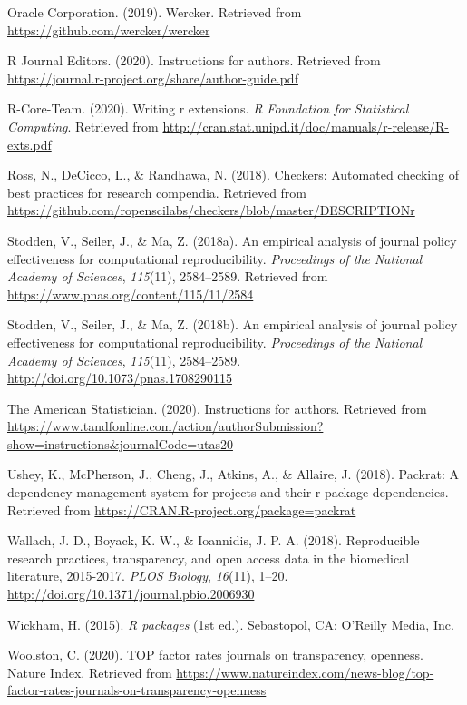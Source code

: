 \documentclass[12pt,twoside]{reedthesis}
\begin{document}
\hypertarget{ref-wercker}{}
Oracle Corporation. (2019). Wercker. Retrieved from
\url{https://github.com/wercker/wercker}

\hypertarget{ref-r-journal}{}
R Journal Editors. (2020). Instructions for authors. Retrieved from
\url{https://journal.r-project.org/share/author-guide.pdf}

\hypertarget{ref-coreteam-extensions}{}
R-Core-Team. (2020). Writing r extensions. \emph{R Foundation for
Statistical Computing}. Retrieved from
\url{http://cran.stat.unipd.it/doc/manuals/r-release/R-exts.pdf}

\hypertarget{ref-R-checkers}{}
Ross, N., DeCicco, L., \& Randhawa, N. (2018). Checkers: Automated
checking of best practices for research compendia. Retrieved from
\url{https://github.com/ropenscilabs/checkers/blob/master/DESCRIPTIONr}

\hypertarget{ref-policy-effectiveness}{}
Stodden, V., Seiler, J., \& Ma, Z. (2018a). An empirical analysis of
journal policy effectiveness for computational reproducibility.
\emph{Proceedings of the National Academy of Sciences}, \emph{115}(11),
2584--2589. Retrieved from
\url{https://www.pnas.org/content/115/11/2584}

\hypertarget{ref-Stodden2584}{}
Stodden, V., Seiler, J., \& Ma, Z. (2018b). An empirical analysis of
journal policy effectiveness for computational reproducibility.
\emph{Proceedings of the National Academy of Sciences}, \emph{115}(11),
2584--2589. \url{http://doi.org/10.1073/pnas.1708290115}

\hypertarget{ref-ams-guide}{}
The American Statistician. (2020). Instructions for authors. Retrieved
from
\url{https://www.tandfonline.com/action/authorSubmission?show=instructions\&journalCode=utas20}

\hypertarget{ref-R-packrat}{}
Ushey, K., McPherson, J., Cheng, J., Atkins, A., \& Allaire, J. (2018).
Packrat: A dependency management system for projects and their r package
dependencies. Retrieved from
\url{https://CRAN.R-project.org/package=packrat}

\hypertarget{ref-plos-biology}{}
Wallach, J. D., Boyack, K. W., \& Ioannidis, J. P. A. (2018).
Reproducible research practices, transparency, and open access data in
the biomedical literature, 2015-2017. \emph{PLOS Biology},
\emph{16}(11), 1--20. \url{http://doi.org/10.1371/journal.pbio.2006930}

\hypertarget{ref-hadley-packages}{}
Wickham, H. (2015). \emph{R packages} (1st ed.). Sebastopol, CA:
O'Reilly Media, Inc.

\hypertarget{ref-top-guidelines}{}
Woolston, C. (2020). TOP factor rates journals on transparency,
openness. Nature Index. Retrieved from
\url{https://www.natureindex.com/news-blog/top-factor-rates-journals-on-transparency-openness}


\end{document}
